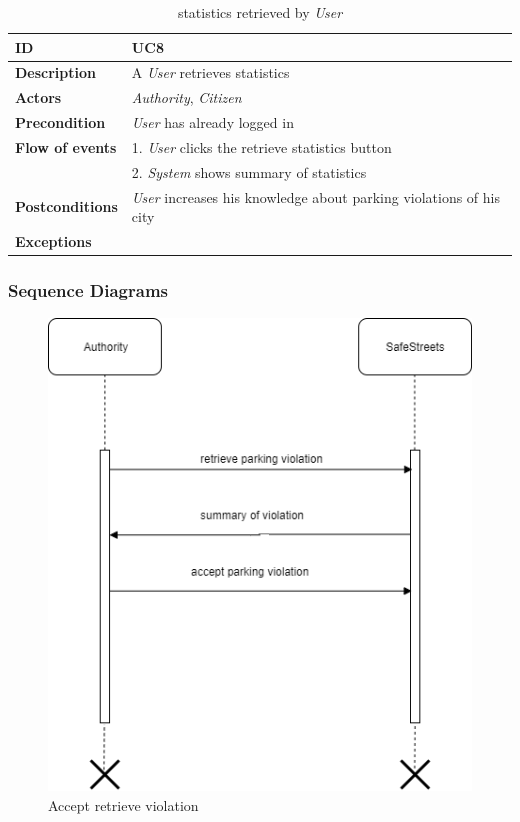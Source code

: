 \documentclass{article}
\begin{document}
\clearpage
\begin{table}
    \begin{center}
    \centering
\begin{tabular}{ | l | l |}
\hline
\textbf{ID} & UC8 \\
\hline
\textbf{Description} & A \textit{User} retrieves statistics  \\
\hline
\textbf{Actors} & \textit{Authority}, \textit{Citizen} \\
\hline
\textbf{Precondition} & \textit{User} has already logged in \\
\hline
\textbf{Flow of events} & 1. \textit{User} clicks the retrieve statistics button \\
                        & 2. \textit{System} shows summary of statistics \\
\hline
\textbf{Postconditions} & \textit{User} increases his knowledge about parking violations of his city  \\
\hline
\textbf{Exceptions} & \\ 
\hline
\end{tabular}
\caption{statistics retrieved by \textit{User} }
\end{center}
\end{table}


\subsubsection{Sequence Diagrams}
\begin{figure}[h!]
    \centering
    \includegraphics[scale=0.5]{img/sequence_diagrams/accept_retrieve_violation.png}
    \caption{Accept retrieve violation}
\end{figure}
\end{document}
